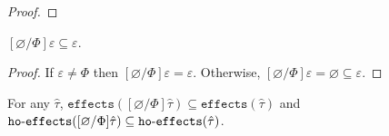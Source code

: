 \documentclass{llncs}
\newcommand{\keywadj}[1]{\mathtt{#1}}
\newcommand{\kwa}[1]{\keywadj{ #1 }}
\newcommand{\hyphen}{\hbox{-}}
\newcommand{\fx}[1]{ \kwa{effects}(#1) }
\newcommand{\hofx}[1]{ \kwa{ho \hyphen effects}(#1) }
\begin{document}
\begin{proof}







\end{proof}

\hrulefill

\begin{lemma}
$[\varnothing/\Phi]\varepsilon \subseteq \varepsilon$.
\end{lemma}

\begin{proof}
If $\varepsilon \neq \Phi$ then $[\varnothing/\Phi]\varepsilon = \varepsilon$. Otherwise, $[\varnothing/\Phi]\varepsilon = \varnothing \subseteq \varepsilon$.
\end{proof}

\hrulefill

\begin{lemma}
For any $\hat \tau$, $\fx{[\varnothing/\Phi]\hat \tau} \subseteq \fx{\hat \tau}$ and $\hofx{[\varnothing/\Phi]\hat \tau} \subseteq \hofx{\hat \tau}$.
\end{lemma}
\end{document}
